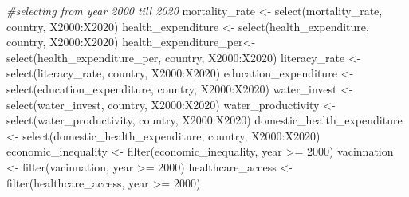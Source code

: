 \documentclass[
]{article}
\newenvironment{Shaded}{\begin{snugshade}}{\end{snugshade}}
\newcommand{\CommentTok}[1]{\textcolor[rgb]{0.56,0.35,0.01}{\textit{#1}}}
\newcommand{\DecValTok}[1]{\textcolor[rgb]{0.00,0.00,0.81}{#1}}
\newcommand{\FunctionTok}[1]{\textcolor[rgb]{0.00,0.00,0.00}{#1}}
\newcommand{\NormalTok}[1]{#1}
\newcommand{\OtherTok}[1]{\textcolor[rgb]{0.56,0.35,0.01}{#1}}
\newcommand{\SpecialCharTok}[1]{\textcolor[rgb]{0.00,0.00,0.00}{#1}}
\newcommand{\StringTok}[1]{\textcolor[rgb]{0.31,0.60,0.02}{#1}}
\begin{document}
\begin{Shaded}
\begin{Highlighting}[]
\CommentTok{\#selecting from year 2000 till 2020}
\NormalTok{mortality\_rate }\OtherTok{\textless{}{-}} \FunctionTok{select}\NormalTok{(mortality\_rate, country, }\StringTok{\textquotesingle{}X2000\textquotesingle{}}\SpecialCharTok{:}\StringTok{\textquotesingle{}X2020\textquotesingle{}}\NormalTok{)}
\NormalTok{health\_expenditure }\OtherTok{\textless{}{-}} \FunctionTok{select}\NormalTok{(health\_expenditure, country, }\StringTok{\textquotesingle{}X2000\textquotesingle{}}\SpecialCharTok{:}\StringTok{\textquotesingle{}X2020\textquotesingle{}}\NormalTok{)}
\NormalTok{health\_expenditure\_per}\OtherTok{\textless{}{-}} \FunctionTok{select}\NormalTok{(health\_expenditure\_per, country, }\StringTok{\textquotesingle{}X2000\textquotesingle{}}\SpecialCharTok{:}\StringTok{\textquotesingle{}X2020\textquotesingle{}}\NormalTok{)}
\NormalTok{literacy\_rate }\OtherTok{\textless{}{-}} \FunctionTok{select}\NormalTok{(literacy\_rate, country, }\StringTok{\textquotesingle{}X2000\textquotesingle{}}\SpecialCharTok{:}\StringTok{\textquotesingle{}X2020\textquotesingle{}}\NormalTok{)}
\NormalTok{education\_expenditure }\OtherTok{\textless{}{-}} \FunctionTok{select}\NormalTok{(education\_expenditure, country, }\StringTok{\textquotesingle{}X2000\textquotesingle{}}\SpecialCharTok{:}\StringTok{\textquotesingle{}X2020\textquotesingle{}}\NormalTok{)}
\NormalTok{water\_invest }\OtherTok{\textless{}{-}} \FunctionTok{select}\NormalTok{(water\_invest, country, }\StringTok{\textquotesingle{}X2000\textquotesingle{}}\SpecialCharTok{:}\StringTok{\textquotesingle{}X2020\textquotesingle{}}\NormalTok{)}
\NormalTok{water\_productivity }\OtherTok{\textless{}{-}} \FunctionTok{select}\NormalTok{(water\_productivity, country, }\StringTok{\textquotesingle{}X2000\textquotesingle{}}\SpecialCharTok{:}\StringTok{\textquotesingle{}X2020\textquotesingle{}}\NormalTok{)}
\NormalTok{domestic\_health\_expenditure }\OtherTok{\textless{}{-}} \FunctionTok{select}\NormalTok{(domestic\_health\_expenditure, country, }\StringTok{\textquotesingle{}X2000\textquotesingle{}}\SpecialCharTok{:}\StringTok{\textquotesingle{}X2020\textquotesingle{}}\NormalTok{)}
\NormalTok{economic\_inequality }\OtherTok{\textless{}{-}} \FunctionTok{filter}\NormalTok{(economic\_inequality, year }\SpecialCharTok{\textgreater{}=} \DecValTok{2000}\NormalTok{)}
\NormalTok{vacinnation }\OtherTok{\textless{}{-}} \FunctionTok{filter}\NormalTok{(vacinnation, year }\SpecialCharTok{\textgreater{}=} \DecValTok{2000}\NormalTok{)}
\NormalTok{healthcare\_access }\OtherTok{\textless{}{-}} \FunctionTok{filter}\NormalTok{(healthcare\_access, year }\SpecialCharTok{\textgreater{}=} \DecValTok{2000}\NormalTok{)}
\end{Highlighting}
\end{Shaded}
\end{document}

